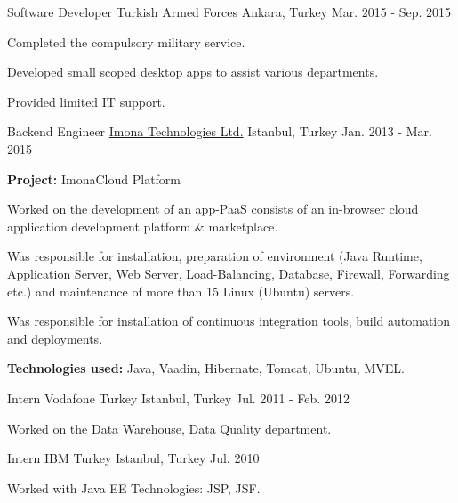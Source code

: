 \begin{cventries}
    \cventry
    {Software Developer}
    {Turkish Armed Forces}
    {Ankara, Turkey}
    {Mar. 2015 - Sep. 2015}
    {
        \begin{cvitems}
            \item{Completed the compulsory military service.}
            \item{Developed small scoped desktop apps to assist various departments.}
            \item{Provided limited IT support.}
        \end{cvitems}
    }

    \cventry
    {Backend Engineer}
    {\href{https://www.imona.com}{Imona Technologies Ltd.}}
    {Istanbul, Turkey}
    {Jan. 2013 - Mar. 2015}
    {
        \begin{cvitems}
            \item {\textbf{Project:} ImonaCloud Platform}
            \item {Worked on the development of an app-PaaS consists of an in-browser
            cloud application development platform \& marketplace.}
            \item{Was responsible for installation, preparation of environment (Java Runtime, Application Server,
                Web Server, Load-Balancing, Database, Firewall, Forwarding etc.) and
                maintenance of more than 15 Linux (Ubuntu) servers.}
            \item{Was responsible for installation of continuous integration tools, build automation and deployments.}
            \smallskip
            \item {\textbf{Technologies used:} Java, Vaadin, Hibernate, Tomcat, Ubuntu, MVEL.}
        \end{cvitems}
    }

    \cventry
    {Intern}
    {Vodafone Turkey}
    {Istanbul, Turkey}
    {Jul. 2011 - Feb. 2012}
    {
        \begin{cvitems}
            \item {Worked on the Data Warehouse, Data Quality department.}
        \end{cvitems}
    }

    \cventry
    {Intern}
    {IBM Turkey}
    {Istanbul, Turkey}
    {Jul. 2010}
    {
        \begin{cvitems}
            \item {Worked with Java EE Technologies: JSP, JSF.}
        \end{cvitems}
    }

\end{cventries}
